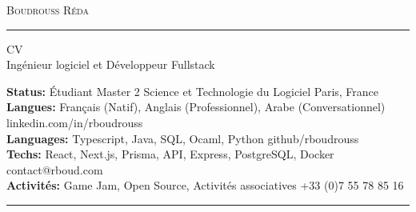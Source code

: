 \documentclass[10pt,A4]{article}
\newcommand{\metasection}[2]
{
\footnotesize{#2} \hspace*{\fill} \footnotesize{#1}\\[1pt]
}
\begin{document}
\pagestyle{fancy}	








\vspace{-8pt}
\begin{center}
	\HUGE \textsc{Boudrouss Réda} \textcolor{sectcol}{\rule[-1mm]{1mm}{0.9cm}} \textsc{CV}\\[2pt]
	\small Ingénieur logiciel et Développeur Fullstack
\end{center}



\vspace{6pt}


\metasection{Paris, France}{\textbf{Status:} Étudiant Master 2 Science et Technologie du Logiciel }
\metasection{linkedin.com/in/rboudrouss}{\textbf{Langues:} Français (Natif), Anglais (Professionnel), Arabe (Conversationnel)} 
\metasection{github/rboudrouss}{\textbf{Languages:} Typescript, Java, SQL, Ocaml, Python}
\metasection{contact@rboud.com}{\textbf{Techs:} React, Next.js, Prisma, API, Express, PostgreSQL, Docker}
\metasection{+33 (0)7 55 78 85 16}{\textbf{Activités:} Game Jam, Open Source, Activités associatives}
\vspace{-2pt}
\textcolor{softcol}{\hrule}
\vspace{6pt}

\normalsize
\end{document}
